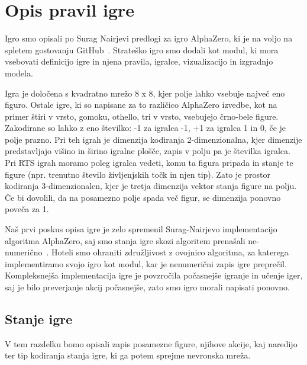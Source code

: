 \documentclass[a4paper, 12pt]{book}
\begin{document}
{\chapter{Opis pravil igre}
\label{chpravilaigre}

Igro smo opisali po Surag Nairjevi predlogi za igro AlphaZero, ki je na voljo na spletem gostovanju GitHub~\cite{alphazerogeneral}.
Strateško igro smo dodali kot modul, ki mora vsebovati definicijo igre in njena pravila, igralce, vizualizacijo in izgradnjo modela.

Igra je določena s kvadratno mrežo 8 x 8, kjer polje lahko vsebuje največ eno figuro.
Ostale igre, ki so napisane za to različico AlphaZero izvedbe, kot na primer štiri v vrsto, gomoku, othello, tri v vrsto, vsebujejo črno-bele figure.
Zakodirane so lahko z eno številko: -1 za igralca -1, +1 za igralca 1 in 0, če je polje prazno.
Pri teh igrah je dimenzija kodiranja 2-dimenzionalna, kjer dimenzije predstavljajo višino in širino igralne plošče, zapis v polju pa je številka igralca.
Pri RTS igrah moramo poleg igralca vedeti, komu ta figura pripada in stanje te figure (npr. trenutno število življenjskih točk in njen tip).
Zato je prostor kodiranja 3-dimenzionalen, kjer je tretja dimenzija vektor stanja figure na polju.
Če bi dovolili, da na posamezno polje spada več figur, se dimenzija ponovno poveča za 1.

Naš prvi poskus opisa igre je zelo spremenil Surag-Nairjevo implementacijo algoritma AlphaZero, saj smo stanja igre skozi algoritem prenašali ne-numerično~\cite{objectAlphaZero}.
Hoteli smo ohraniti združljivost z ovojnico algoritma, za katerega implementiramo svojo igro kot modul, kar je nenumerični zapis igre preprečil.
Kompleksnejša implementacija igre je povzročila počasnejše igranje in učenje iger, saj je bilo preverjanje akcij počasnejše, zato smo igro morali napisati ponovno.

\section{Stanje igre}
\label{stanjeigre}
V tem razdelku bomo opisali zapis posamezne figure, njihove akcije, kaj naredijo ter tip kodiranja stanja igre, ki ga potem sprejme nevronska mreža.

}
\end{document}

